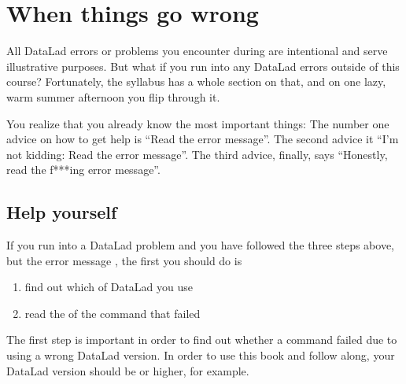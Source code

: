 \chapter{When things go wrong}
\label{\detokenize{basics/101-135-help:when-things-go-wrong}}\label{\detokenize{basics/101-135-help:help}}\label{\detokenize{basics/101-135-help:index-0}}\label{\detokenize{basics/101-135-help::doc}}

\sphinxAtStartPar
All DataLad errors or problems you encounter during  are intentional
and serve illustrative purposes. But what if you run into any DataLad errors
outside of this course?
Fortunately, the syllabus has a whole section on that, and on
one lazy, warm summer afternoon you flip through it.

\sphinxAtStartPar
You realize that you already know the most important things:
The number one advice on how to get help is
“Read the error message”.
The second advice it
“I’m not kidding: Read the error message”.
The third advice, finally, says
“Honestly, read the f***ing error message”.


\section{Help yourself}
\label{\detokenize{basics/101-135-help:help-yourself}}
\sphinxAtStartPar
If you run into a DataLad problem and you have followed the three
steps above, but the error message
,
the first you should do is
\begin{enumerate}
%
\item {} 
\sphinxAtStartPar
find out which  of DataLad you use

\item {} 
\sphinxAtStartPar
read the  of the command that failed

\end{enumerate}

\sphinxAtStartPar
The first step is important in order to find out whether a
command failed due to using a wrong DataLad version. In order
to use this book and follow along, your DataLad version
should be  or higher, for example.

